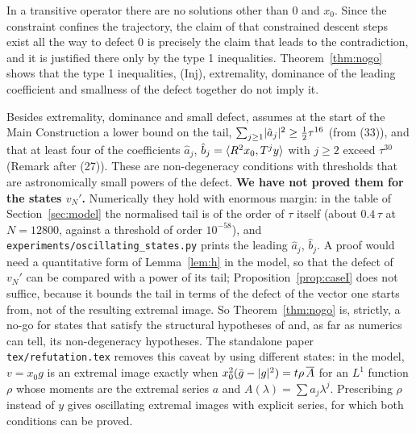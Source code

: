 \begin{remark}
In a transitive operator there are no solutions other than $0$ and $x_0$. Since the constraint
confines the trajectory, the claim of \paper{} that constrained descent steps exist all the way
to defect $0$ is precisely the claim that leads to the contradiction, and it is justified there
only by the type 1 inequalities. Theorem~\ref{thm:nogo} shows that the type 1 inequalities,
\textup{(Inj)}, extremality, dominance of the leading coefficient and smallness of the defect
together do not imply it.
\end{remark}

\begin{remark}\label{rem:33}
Besides extremality, dominance and small defect, \paper{} assumes at the start of the Main
Construction a lower bound on the tail, $\sum_{j\ge1}\lvert \hat a_j\rvert^2\ge\frac12\tau^{16}$ (from
(33)), and that at least four of the coefficients $\hat a_j$,
$\hat b_j=\langle R^2x_0,T^jy\rangle$ with $j\ge2$ exceed $\tau^{30}$ (Remark after (27)). These are
non-degeneracy conditions with thresholds that are astronomically small powers of the defect.
\textbf{We have not proved them for the states $v_N'$.} Numerically they hold with enormous
margin: in the table of Section~\ref{sec:model} the normalised tail is of the order of $\tau$
itself (about $0.4\,\tau$ at $N=12800$, against a threshold of order $10^{-58}$), and
\texttt{experiments/oscillating\_states.py} prints the leading $\hat a_j$, $\hat b_j$. A proof
would need a quantitative form of Lemma~\ref{lem:h} in the model, so that the defect of $v_N'$
can be compared with a power of its tail; Proposition~\ref{prop:caseI} does not suffice, because
it bounds the tail in terms of the defect of the vector one starts from, not of the resulting
extremal image. So Theorem~\ref{thm:nogo} is, strictly, a no-go for states that satisfy the
structural hypotheses of \paper{} and, as far as numerics can tell, its non-degeneracy
hypotheses. The standalone paper \texttt{tex/refutation.tex} removes this caveat by using
different states: in the model, $v=x_0g$ is an extremal image exactly when
$x_0^2(\bar g-\lvert g\rvert^2)=t\rho\,\overline{A}$ for an $L^1$ function $\rho$ whose moments are
the extremal series $a$ and $A(\lambda)=\sum a_j\lambda^j$. Prescribing $\rho$ instead of $y$
gives oscillating extremal images with explicit series, for which both conditions can be
proved.
\end{remark}

